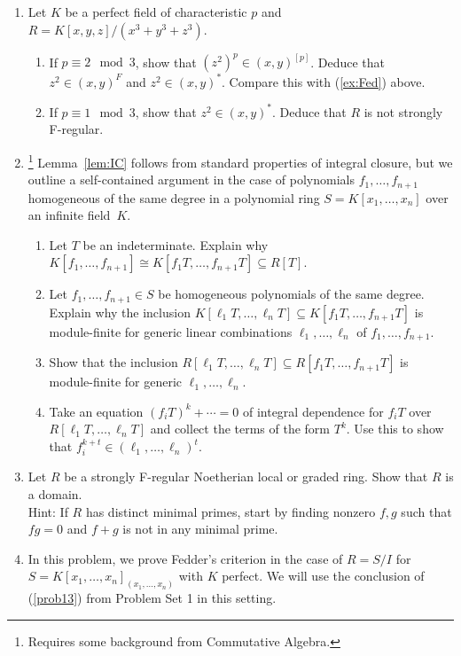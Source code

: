 \documentclass[12pt]{amsart}
\theoremstyle{definition}
\numberwithin{equation}{theorem}
\begin{document}
\begin{enumerate}
\item Let $K$ be a perfect field of characteristic $p$ and $R=K[x,y,z]/(x^3+y^3+z^3)$.
\begin{enumerate}
\item If $p \equiv 2 \mod 3$, show that $(z^2)^p \in (x,y)^{[p]}$. Deduce that $z^2\in (x,y)^F$ and $z^2\in (x,y)^*$. Compare this with (\ref{ex:Fed}) above.
\item If $p \equiv 1 \mod 3$, show that $z^2\in (x,y)^*$. Deduce that $R$ is not strongly F-regular.
\end{enumerate}

\item\footnote[2]{Requires some background from Commutative Algebra.} Lemma~\ref{lem:IC} follows from standard properties of integral closure, but we outline a self-contained argument in the case of polynomials $f_1,\dots, f_{n+1}$ homogeneous of the same degree in a polynomial ring $S=K[x_1,\dots,x_n]$ over an infinite field~$K$.
\begin{enumerate}
\item Let $T$ be an indeterminate. Explain why $K[f_1,\dots,f_{n+1}] \cong K[f_1T,\dots,f_{n+1}T] \subseteq R[T]$.
\item Let $f_1,\dots,f_{n+1} \in S$ be homogeneous polynomials of the same degree. Explain why the inclusion $K[\ell_1T,\dots,\ell_nT]\subseteq K[f_1T,\dots,f_{n+1}T]$ is module-finite for generic linear combinations $\ell_1,\dots,\ell_n$ of $f_1,\dots,f_{n+1}$.
\item Show that the inclusion $R[\ell_1T,\dots,\ell_nT]\subseteq R[f_1T,\dots,f_{n+1}T]$ is module-finite for generic $\ell_1,\dots,\ell_n$.
\item Take an equation $(f_iT)^k + \cdots = 0$ of integral dependence for $f_i T$ over $R[\ell_1T,\dots,\ell_nT]$ and collect the terms of the form $T^k$. Use this to show that $f_i^{k+t} \in (\ell_1,\dots,\ell_n)^t$.
\end{enumerate}
\item \footnotemark[2] Let $R$ be a strongly F-regular Noetherian local or graded ring. Show that $R$ is a domain. \\ Hint: If $R$ has distinct minimal primes, start by finding nonzero $f,g$ such that $fg=0$ and $f+g$ is not in any minimal prime.
\item In this problem, we prove Fedder's criterion in the case of $R=S/I$ for $S=K[x_1,\dots,x_n]_{(x_1,\dots,x_n)}$ with $K$ perfect. We will use the conclusion of (\ref{prob13}) from Problem Set 1 in this setting.
\begin{enumerate}

\end{enumerate}
\end{enumerate}
\end{document}
